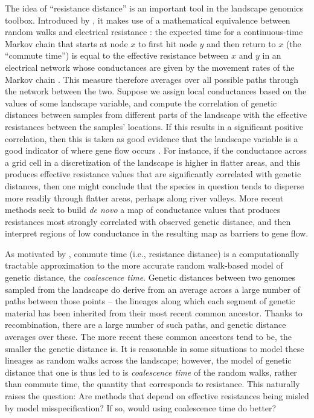 \documentclass{article}
\begin{document}
The idea of ``resistance distance'' is an important tool in the landscape genomics toolbox.
Introduced by \citet{mcrae2006isolation},
it makes use of a mathematical equivalence between random walks and electrical resistance
\citep{nashwilliams1959random}:
the expected time for a continuous-time Markov chain that starts at node $x$
to first hit node $y$ and then return to $x$ (the ``commute time'')
is equal to the effective resistance between $x$ and $y$ in an electrical network
whose conductances are given by the movement rates of the Markov chain \citep{levin2008markov,doyle2006random}.
This measure therefore averages over all possible paths through the network between the two.
Suppose we
assign local conductances based on the values of some landscape variable, 
and compute the correlation of
genetic distances between samples from different parts of the landscape
with the effective resistances between the samples' locations.
If this results in a significant positive correlation,
then this is taken as good evidence that the landscape variable is a good indicator of
where gene flow occurs \citep{mcrae2007circuit,cushman2006complex}.
For instance,
if the conductance across a grid cell in a discretization of the landscape
is higher in flatter areas,
and this produces effective resistance values 
that are significantly correlated with genetic distances,
then one might conclude that the species in question tends to disperse more readily through flatter areas,
perhaps along river valleys.
More recent methods \citep{petkova2016visualizing,hanks2013circuit} seek to build \emph{de novo} 
a map of conductance values that produces resistances 
most strongly correlated with observed genetic distance,
and then interpret regions of low conductance in the resulting map as barriers to gene flow.

As motivated by \citet{mcrae2006isolation},
commute time (i.e., resistance distance) is a computationally tractable approximation
to the more accurate random walk-based model of genetic distance,
the \emph{coalescence time}.
Genetic distances between two genomes sampled from the landscape
do derive from an average across a large number of paths between those points --
the lineages along which each segment of genetic material has been inherited
from their most recent common ancestor.
Thanks to recombination, there are a large number of such paths, 
and genetic distance averages over these.
The more recent these common ancestors tend to be,
the smaller the genetic distance is.
It is reasonable in some situations to model these lineages as random walks across the landscape;
however, the model of genetic distance that one is thus led to
is \emph{coalescence time} of the random walks, 
rather than commute time, the quantity that corresponds to resistance.
This naturally raises the question: 
Are methods that depend on effective resistances being misled by model misspecification?
If so, would using coalescence time do better?
\end{document}
